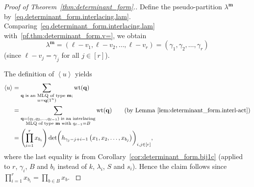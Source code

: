 \documentclass[reqno]{amsart}
\newcommand{\0}{\phantom{c}}
\newcommand{\swt}[1]{\left\langle #1 \right\rangle} %
\DeclareMathOperator{\wt}{wt} %
\newcommand{\mm}{\mathbf{m}}
\newcommand{\qq}{\mathbf{q}}
\newcommand{\NN}{\mathbb{N}}
\let\sumnonlimits\sum
\let\prodnonlimits\prod
\renewcommand{\sum}{\sumnonlimits\limits}
\renewcommand{\prod}{\prodnonlimits\limits}
\newenvironment{verlong}{}{}
\newcommand{\set}[1]{\left\{ #1 \right\}}
\newcommand{\tup}[1]{\left( #1 \right)}
\newcommand{\ive}[1]{\left[ #1 \right]}
\theoremstyle{plain}
\theoremstyle{definition}
\numberwithin{equation}{section}
\begin{document}
\begin{proof}[Proof of Theorem~\ref{thm:determinant_form}.]

Define the pseudo-partition $\lambda^{\mm}$ by~\eqref{eq.determinant_form.interlacing.lam}.
Comparing~\eqref{eq.determinant_form.interlacing.lam} with~\eqref{pf.thm:determinant_form.v=}, we obtain
\[
\lambda^{\mm} = \tup{\ell-v_1, \ell-v_2, \dotsc, \ell-v_r}
= \tup{\gamma_1, \gamma_2, \ldots, \gamma_r}
\]
(since $\ell - v_j = \gamma_j$ for all $j \in \ive{r}$).

The definition of $\swt{u}$ yields
\begin{align*}
\swt{u} & = \sum_{\substack{\qq \text{ is an MLQ of type } \mm; \\ u=\qq(1^n)}}\wt(\qq) \\
&  = \sum_{\substack{\qq = \tup{q_1, q_2, \dotsc, q_{\ell-1}} \text{ is an interlacing} \\\text{MLQ of type } \mm \text{ with } q_{\ell-1}=B}} \wt(\qq) \qquad \text{(by Lemma~\ref{lem:determinant_form.interl-act})} \\
&  = \left(  \prod_{i=1}^r x_{b_i} \right) \det\biggl( h_{\gamma_j-j+i-1}\left(x_1,x_2,\ldots,x_{b_j}\right)  \biggr)_{i, j \in \ive{r}} ,
\end{align*}
where the last equality is from Corollary~\ref{cor:determinant_form.bij1c} (applied to $r$, $\gamma_i$, $B$ and $b_i$ instead of $k$, $\lambda_i$, $S$ and $s_i$).
\begin{verlong}
Hence the claim follows since $\prod_{i=1}^r x_{b_i} = \prod_{b \in B} x_b$.
\end{verlong}
\end{proof}
\end{document}
